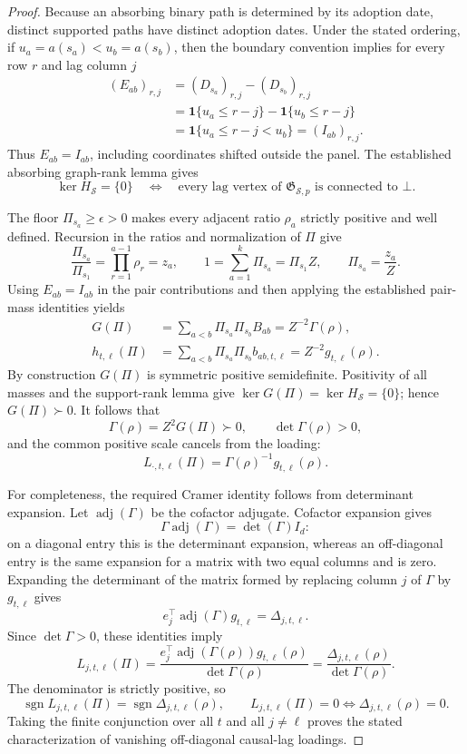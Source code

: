 \documentclass{article}
\begin{document}
\begin{proof}
Because an absorbing binary path is determined by its adoption date, distinct supported paths have distinct adoption dates.  Under the stated ordering, if \(u_a=a(s_a)<u_b=a(s_b)\), then the boundary convention implies for every row \(r\) and lag column \(j\)
\[
\begin{aligned}
 (E_{ab})_{r,j}
 &=(D_{s_a})_{r,j}-(D_{s_b})_{r,j}\\
 &=\mathbf 1\{u_a\leq r-j\}-\mathbf 1\{u_b\leq r-j\}\\
 &=\mathbf 1\{u_a\leq r-j<u_b\}
 =(I_{ab})_{r,j}.
\end{aligned}
\]
Thus \(E_{ab}=I_{ab}\), including coordinates shifted outside the panel.  The established absorbing graph-rank lemma gives
\[
 \ker H_{\mathcal S}=\{0\}
 \quad\Longleftrightarrow\quad
 \text{every lag vertex of }\mathfrak G_{\mathcal S,p}\text{ is connected to }\bot.
\]

The floor \(\Pi_{s_a}\geq\epsilon>0\) makes every adjacent ratio \(\rho_a\) strictly positive and well defined.  Recursion in the ratios and normalization of \(\Pi\) give
\[
 \frac{\Pi_{s_a}}{\Pi_{s_1}}
 =\prod_{r=1}^{a-1}\rho_r=z_a,
 \qquad
 1=\sum_{a=1}^{k}\Pi_{s_a}=\Pi_{s_1}Z,
 \qquad
 \Pi_{s_a}=\frac{z_a}{Z}.
\]
Using \(E_{ab}=I_{ab}\) in the pair contributions and then applying the established pair-mass identities yields
\[
\begin{aligned}
 G(\Pi)
 &=\sum_{a<b}\Pi_{s_a}\Pi_{s_b}B_{ab}
 =Z^{-2}\Gamma(\rho),\\
 h_{t,\ell}(\Pi)
 &=\sum_{a<b}\Pi_{s_a}\Pi_{s_b}b_{ab,t,\ell}
 =Z^{-2}g_{t,\ell}(\rho).
\end{aligned}
\]
By construction \(G(\Pi)\) is symmetric positive semidefinite.  Positivity of all masses and the support-rank lemma give
\(\ker G(\Pi)=\ker H_{\mathcal S}=\{0\}\); hence \(G(\Pi)\succ0\).  It follows that
\[
 \Gamma(\rho)=Z^2G(\Pi)\succ0,
 \qquad \det\Gamma(\rho)>0,
\]
and the common positive scale cancels from the loading:
\[
 L_{\cdot,t,\ell}(\Pi)=\Gamma(\rho)^{-1}g_{t,\ell}(\rho).
\]

For completeness, the required Cramer identity follows from determinant expansion.  Let \(\operatorname{adj}(\Gamma)\) be the cofactor adjugate.  Cofactor expansion gives
\[
 \Gamma\operatorname{adj}(\Gamma)=\det(\Gamma)I_d:
\]
on a diagonal entry this is the determinant expansion, whereas an off-diagonal entry is the same expansion for a matrix with two equal columns and is zero.  Expanding the determinant of the matrix formed by replacing column \(j\) of \(\Gamma\) by \(g_{t,\ell}\) gives
\[
 e_j^{\top}\operatorname{adj}(\Gamma)g_{t,\ell}
 =\Delta_{j,t,\ell}.
\]
Since \(\det\Gamma>0\), these identities imply
\[
 L_{j,t,\ell}(\Pi)
 =\frac{e_j^{\top}\operatorname{adj}(\Gamma(\rho))g_{t,\ell}(\rho)}
        {\det\Gamma(\rho)}
 =\frac{\Delta_{j,t,\ell}(\rho)}{\det\Gamma(\rho)}.
\]
The denominator is strictly positive, so
\[
 \operatorname{sgn}L_{j,t,\ell}(\Pi)
 =\operatorname{sgn}\Delta_{j,t,\ell}(\rho),
 \qquad
 L_{j,t,\ell}(\Pi)=0
 \Longleftrightarrow
 \Delta_{j,t,\ell}(\rho)=0.
\]
Taking the finite conjunction over all \(t\) and all \(j\neq\ell\) proves the stated characterization of vanishing off-diagonal causal-lag loadings.


\end{proof}
\end{document}
